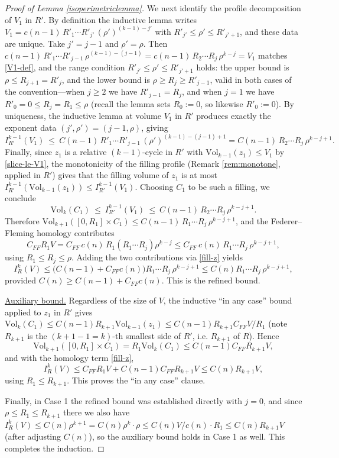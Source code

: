 \documentclass{amsart}
\newtheorem*{theorem 1}{Theorem 1}
\newtheorem*{theorem 2}{Theorem 2}
\newtheorem*{theorem 3}{Theorem 3}
\numberwithin{equation}{section}
\newcommand{\Vol}{\textrm{Vol}}
\begin{document}
\begin{proof} [Proof of Lemma \ref{isoperimetriclemma}]
We next identify the profile decomposition of $V_1$ in $R'$.  By
definition the inductive lemma writes
$V_1 = c(n-1)\, R'_1 \cdots R'_{j'}\,(\rho')^{(k-1)-j'}$ with
$R'_{j'} \le \rho' \le R'_{j'+1}$, and these data are unique.  Take
$j' = j-1$ and $\rho' = \rho$.  Then
$c(n-1)\, R'_1 \cdots R'_{j-1}\,\rho^{(k-1)-(j-1)}
 = c(n-1)\, R_2 \cdots R_j\, \rho^{k-j} = V_1$ matches
\eqref{V1-def}, and the range condition
$R'_{j'} \le \rho' \le R'_{j'+1}$ holds: the upper bound is
$\rho \le R_{j+1} = R'_{j}$, and the lower bound is
$\rho \ge R_j \ge R'_{j-1}$, valid in both cases of the
convention---when $j \ge 2$ we have $R'_{j-1} = R_j$, and when
$j = 1$ we have $R'_{0} = 0 \le R_j = R_1 \le \rho$ (recall the
lemma sets $R_0 := 0$, so likewise $R'_0 := 0$).  By uniqueness, the inductive lemma at
volume $V_1$ in $R'$ produces exactly the exponent data
$(j',\rho') = (j-1,\rho)$, giving
$$ I^{k-1}_{R'}(V_1) \ \le\ C(n-1)\, R'_1 \cdots R'_{j-1}\,
   (\rho')^{(k-1)-(j-1)+1}
   = C(n-1)\, R_2 \cdots R_j\, \rho^{k-j+1} . $$
Finally, since $z_1$ is a relative $(k-1)$-cycle in $R'$ with
$\Vol_{k-1}(z_1) \le V_1$ by \eqref{slice-le-V1}, the monotonicity
of the filling profile (Remark \ref{rem:monotone}, applied in $R'$)
gives that the filling volume of $z_1$ is at most
$I^{k-1}_{R'}(\Vol_{k-1}(z_1)) \le I^{k-1}_{R'}(V_1)$.  Choosing
$C_1$ to be such a filling, we conclude
$$ \Vol_k(C_1) \ \le\ I^{k-1}_{R'}(V_1)
   \ \le\ C(n-1)\, R_2 \cdots R_j\, \rho^{k-j+1}. $$
Therefore $\Vol_{k+1}([0,R_1]\times C_1) \le C(n-1)\, R_1 \cdots
R_j\, \rho^{k-j+1}$, and the Federer--Fleming homology contributes
$$ C_{FF} R_1 V = C_{FF}\, c(n)\, R_1 (R_1 \cdots R_j)\rho^{k-j}
   \le C_{FF}\, c(n)\, R_1 \cdots R_j\, \rho^{k-j+1}, $$
using $R_1 \le R_j \le \rho$.  Adding the two contributions via
\eqref{fill-z} yields
$$ I_R^k(V) \le \big(C(n-1) + C_{FF} c(n)\big) R_1 \cdots R_j\,
   \rho^{k-j+1} \le C(n) R_1 \cdots R_j\, \rho^{k-j+1}, $$
provided $C(n) \ge C(n-1) + C_{FF} c(n)$.  This is the refined
bound.

\underline{Auxiliary bound.}  Regardless of the size of $V$, the
inductive ``in any case'' bound applied to $z_1$ in $R'$ gives
$\Vol_k(C_1) \le C(n-1) R_{k+1} \Vol_{k-1}(z_1) \le C(n-1) R_{k+1}
C_{FF} V / R_1$ (note $R_{k+1}$ is the $(k+1-1=k)$-th smallest side
of $R'$, i.e. $R_{k+1}$ of $R$).  Hence
$$ \Vol_{k+1}([0,R_1]\times C_1) = R_1 \Vol_k(C_1)
   \le C(n-1) C_{FF} R_{k+1} V, $$
and with the homology term \eqref{fill-z},
$$ I_R^k(V) \le C_{FF} R_1 V + C(n-1) C_{FF} R_{k+1} V
   \le C(n) R_{k+1} V, $$
using $R_1 \le R_{k+1}$.  This proves the ``in any case'' clause.

\medskip
Finally, in Case 1 the refined bound was established directly with
$j=0$, and since $\rho \le R_1 \le R_{k+1}$ there we also have
$I_R^k(V) \le C(n)\rho^{k+1} = C(n) \rho^k \cdot \rho \le C(n) V /
c(n) \cdot R_1 \le C(n) R_{k+1} V$ (after adjusting $C(n)$), so the
auxiliary bound holds in Case 1 as well.  This completes the
induction.
\end{proof}
\end{document}
